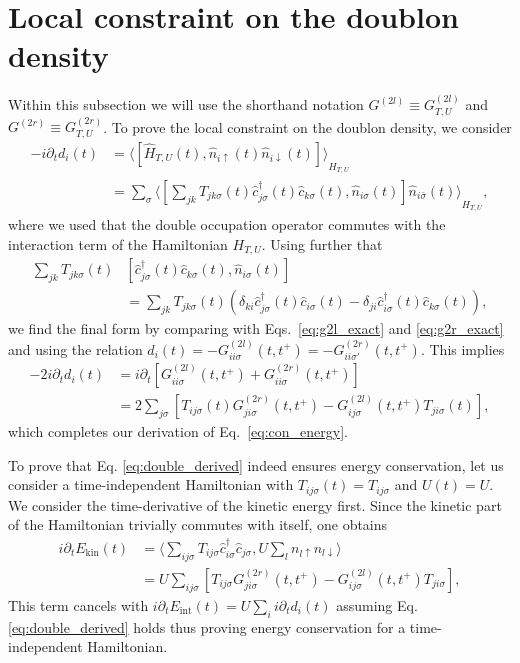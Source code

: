 \documentclass[twocolumn,prb,showpacs,aps,superscriptaddress]{revtex4}
\newcommand{\cd}[1]{\ensuremath{\hat{c}^\dagger_{#1}}}
\newcommand{\cc}[1]{\ensuremath{\hat{c}_{#1}}}
\newcommand{\est}[1]{\ensuremath{\langle {#1} \rangle}}
\begin{document}
\appendix

\section{Local constraint on the doublon density}
\label{ap:con_double_occ}

Within this subsection we will use the shorthand notation $G^{(2l)} \equiv
G^{(2l)}_{T,U}$ and $G^{(2r)} \equiv G^{(2r)}_{T,U}$. To prove the local 
constraint on the doublon density, we consider
\begin{align}
  -i\partial_t d_i(t) 
  &=
  \est{[\hat{H}_{T,U}(t),
         \hat{n}_{i\uparrow}(t)\hat{n}_{i\downarrow}(t)]}_{H_{T,U}} \nonumber\\
  &= 
  \sum_{\sigma}
  \est{
    \left[
      \sum_{jk}T_{jk\sigma}(t)\cd{j\sigma}(t)\cc{k\sigma}(t),
      \hat n_{i\sigma}(t) 
    \right]\hat n_{i\bar\sigma}(t)}_{H_{T,U}},
\end{align}
where we used that the double occupation operator commutes with the interaction
term of the Hamiltonian $H_{T,U}$. Using further that
\begin{align}
  \sum_{jk}T_{jk\sigma}(t)
  &\left[
    \cd{j\sigma}(t)\cc{k\sigma}(t),
    \hat n_{i\sigma}(t) 
  \right]\\
  &=
  \sum_{jk}T_{jk\sigma}(t)
  \left(
    \delta_{ki}\cd{j\sigma}(t)\cc{i\sigma}(t)
    -
    \delta_{ji}\cd{i\sigma}(t)\cc{k\sigma}(t)
  \right),\nonumber
\end{align}
we find the final form by comparing with Eqs.\ \eqref{eq:g2l_exact} and
\eqref{eq:g2r_exact} and using the relation $d_i(t) =
-G^{(2l)}_{ii\sigma}(t,t^+) = -G^{(2r)}_{ii\sigma'}(t,t^+)$. This implies
\begin{align}
  \label{eq:double_derived}
  -2i\partial_t d_i(t) 
  &=
  i\partial_t
  \left[
    G^{(2l)}_{ii\sigma}(t,t^+)
    +
    G^{(2r)}_{ii\sigma}(t,t^+)
  \right]\\
  &=
  2\sum_{j\sigma}
  \left[
    T_{ij\sigma}(t)G^{(2r)}_{ji\sigma}(t,t^+)
    -
    G^{(2l)}_{ij\sigma}(t,t^+)T_{ji\sigma}(t)
  \right],\nonumber
\end{align}
which completes our derivation of Eq.\ \eqref{eq:con_energy}.

To prove that Eq. \eqref{eq:double_derived} indeed ensures energy conservation,
let us consider a time-independent Hamiltonian with $T_{ij\sigma}(t) =
T_{ij\sigma}$ and $U(t) = U$.  We consider the time-derivative of the kinetic
energy first. Since the kinetic part of the Hamiltonian trivially commutes with
itself, one obtains
\begin{align}
  i\partial_t E_\text{kin}(t)
  &= 
  \est{
    \sum_{ij\sigma} T_{ij\sigma}\cd{i\sigma}\cc{j\sigma},
    U\sum_l n_{l\uparrow}n_{l\downarrow}
  }\\
  &=
  U
  \sum_{ij\sigma}
  \left[
    T_{ij\sigma}G^{(2r)}_{ji\sigma}(t,t^+)
    -
    G^{(2l)}_{ij\sigma}(t,t^+)T_{ji\sigma}
  \right],\nonumber
\end{align}
This term cancels with $i\partial_t E_\text{int}(t) = U \sum_{i}
i\partial_t d_i(t)$ assuming Eq. \eqref{eq:double_derived} holds thus proving
energy conservation for a time-independent Hamiltonian.
\end{document}
